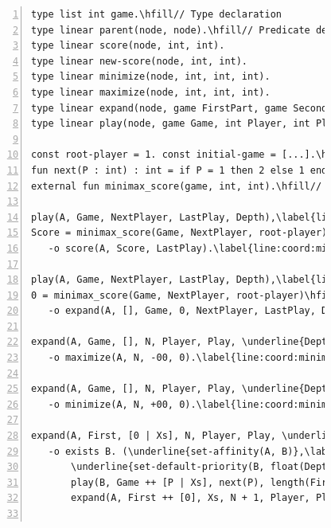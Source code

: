 \begin{figure}[ht]
\begin{Verbatim}[numbers=left,commandchars=\\\{\},fontsize=\scriptsize]
type list int game.\hfill// Type declaration
type linear parent(node, node).\hfill// Predicate declaration
type linear score(node, int, int).
type linear new-score(node, int, int).
type linear minimize(node, int, int, int).
type linear maximize(node, int, int, int).
type linear expand(node, game FirstPart, game SecondPart, int Descendants, int Player, int Play, int Depth).
type linear play(node, game Game, int Player, int Play, int Depth).

const root-player = 1. const initial-game = [...].\hfill// Constant declaration: player and initial game state
fun next(P : int) : int = if P = 1 then 2 else 1 end.\hfill// Function declaration: select next player
external fun minimax_score(game, int, int).\hfill// Returns the score of a board

play(A, Game, NextPlayer, LastPlay, Depth),\label{line:coord:minimax_play1}\label{line:coord:minimax_play11}\hfill// Rule 1: ending game state
Score = minimax_score(Game, NextPlayer, root-player), Score > 0
   -o score(A, Score, LastPlay).\label{line:coord:minimax_play12}

play(A, Game, NextPlayer, LastPlay, Depth),\label{line:coord:minimax_play21}\hfill// Rule 2: expand state
0 = minimax_score(Game, NextPlayer, root-player)\hfill// minimax_score is an external function
   -o expand(A, [], Game, 0, NextPlayer, LastPlay, Depth).\label{line:coord:minimax_play2}\label{line:coord:minimax_play22}

expand(A, Game, [], N, Player, Play, \underline{Depth}), Player = root-player\label{line:coord:minimax_expand1}\label{line:coord:minimax_rule11}\hfill// Rule 3: maximize node
   -o maximize(A, N, -00, 0).\label{line:coord:minimax_rule12}

expand(A, Game, [], N, Player, Play, \underline{Depth}), Player <> root-player\label{line:coord:minimax_rule21}\hfill// Rule 4: minimize node
   -o minimize(A, N, +00, 0).\label{line:coord:minimax_rule22}

expand(A, First, [0 | Xs], N, Player, Play, \underline{Depth}), Depth >= 5\label{line:coord:minimax_rule31}\hfill// Rule 5: create static child node
   -o exists B. (\underline{set-affinity(A, B)},\label{line:coord:minimax_coord1}
       \underline{set-default-priority(B, float(Depth + 1))},\label{line:coord:minimax_coord2}
       play(B, Game ++ [P | Xs], next(P), length(First), \underline{Depth + 1}), parent(B, A).
       expand(A, First ++ [0], Xs, N + 1, Player, Play, \underline{Depth})).\label{line:coord:minimax_rule32}


\end{Verbatim}
\end{figure}
